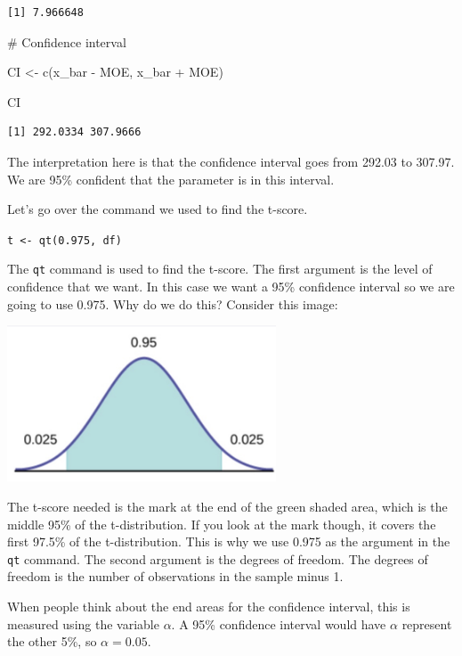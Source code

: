 \documentclass[
  letterpaper,
  DIV=11,
  numbers=noendperiod]{scrreprt}
\newenvironment{Shaded}{\begin{snugshade}}{\end{snugshade}}
\newcommand{\CommentTok}[1]{\textcolor[rgb]{0.37,0.37,0.37}{#1}}
\newcommand{\FunctionTok}[1]{\textcolor[rgb]{0.28,0.35,0.67}{#1}}
\newcommand{\NormalTok}[1]{\textcolor[rgb]{0.00,0.23,0.31}{#1}}
\newcommand{\OtherTok}[1]{\textcolor[rgb]{0.00,0.23,0.31}{#1}}
\newcommand{\SpecialCharTok}[1]{\textcolor[rgb]{0.37,0.37,0.37}{#1}}
\begin{document}
\begin{verbatim}
[1] 7.966648
\end{verbatim}

\begin{Shaded}
\begin{Highlighting}[]
\CommentTok{\# Confidence interval}

\NormalTok{CI }\OtherTok{\textless{}{-}} \FunctionTok{c}\NormalTok{(x\_bar }\SpecialCharTok{{-}}\NormalTok{ MOE, x\_bar }\SpecialCharTok{+}\NormalTok{ MOE)}

\NormalTok{CI}
\end{Highlighting}
\end{Shaded}

\begin{verbatim}
[1] 292.0334 307.9666
\end{verbatim}

The interpretation here is that the confidence interval goes from 292.03
to 307.97. We are 95\% confident that the parameter is in this interval.

Let's go over the command we used to find the t-score.

\texttt{t\ \textless{}-\ qt(0.975,\ df)}

The \texttt{qt} command is used to find the t-score. The first argument
is the level of confidence that we want. In this case we want a 95\%
confidence interval so we are going to use 0.975. Why do we do this?
Consider this image:

\includegraphics[width=0.6\textwidth,height=\textheight]{./images/EPCI_9.jpg}

The t-score needed is the mark at the end of the green shaded area,
which is the middle 95\% of the t-distribution. If you look at the mark
though, it covers the first 97.5\% of the t-distribution. This is why we
use 0.975 as the argument in the \texttt{qt} command. The second
argument is the degrees of freedom. The degrees of freedom is the number
of observations in the sample minus 1.

When people think about the end areas for the confidence interval, this
is measured using the variable \(\alpha\). A 95\% confidence interval
would have \(\alpha\) represent the other 5\%, so \(\alpha = 0.05\).
\end{document}
